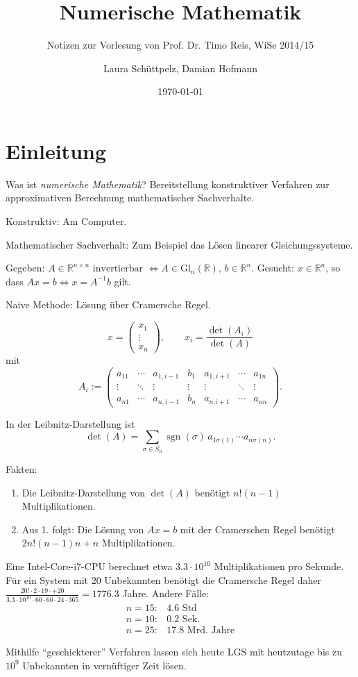\documentclass[11pt]{scrartcl}
\title{Numerische Mathematik}
\subtitle{Notizen zur Vorlesung von Prof. Dr. Timo Reis, WiSe 2014/15}
\author{Laura Schüttpelz, Damian Hofmann}
\date{\today}
\newcommand*{\RR}{\mathbb R}
\newcommand*{\Gl}{\mathrm{Gl}}
\newcommand{\e}[1]{\cdot 10^{#1}}
\DeclareMathOperator*{\sgn}{\mathrm{sgn}}
\theoremstyle{break}
\theoremstyle{remark}
\begin{document}
\maketitle

\section{Einleitung}
Was ist \emph{numerische Mathematik}? Bereitstellung konstruktiver Verfahren zur approximativen Berechnung mathematischer Sachverhalte.

Konstruktiv: Am Computer.

Mathematischer Sachverhalt: Zum Beispiel das Lösen linearer Gleichungssysteme.

\begin{Beispiel}

Gegeben: $A \in \RR^{n\times n} \text{ invertierbar } \Leftrightarrow A \in \Gl_n(\RR)$,
$b \in \RR^n$.
Gesucht: $x \in \RR^n$, so dass $Ax = b \Leftrightarrow x = A^{-1} b$ gilt.

Naive Methode: Lösung über Cramersche Regel.

$$x = \begin{pmatrix}x_1 \\ \vdots \\ x_n \end{pmatrix}, \qquad x_i = \frac{\det(A_i)}{\det(A)}$$
mit $$A_i :=
\begin{pmatrix}
  a_{11} & \cdots & a_{1,i-1} & b_1 & a_{1,i+1} & \cdots & a_{1n} \\
  \vdots & \ddots & \vdots & \vdots & \vdots & \ddots & \vdots \\
  a_{n1} & \cdots & a_{n,i-1} & b_n & a_{n.i+1} & \cdots & a_{nn}
\end{pmatrix}.$$

In der Leibnitz-Darstellung ist $$\det(A) = \sum_{\sigma\in S_n} \sgn(\sigma)\, a_{1\sigma(1)} \cdots a_{n\sigma(n)}.$$

Fakten:
\begin{enumerate}
\item Die Leibnitz-Darstellung von $\det(A)$ benötigt $n! (n-1)$ Multiplikationen.
\item Aus 1. folgt: Die Lösung von $Ax=b$ mit der Cramerschen Regel benötigt $2n!(n-1)n + n$
      Multiplikationen.
\end{enumerate}

Eine Intel-Core-i7-CPU berechnet etwa $3.3\e{10}$ Multiplikationen pro Sekunde.
Für ein System mit 20 Unbekannten benötigt die Cramersche Regel daher
$ \frac{20! \cdot 2 \cdot 19 \cdot +20}{3.3 \cdot 10^{10} 
\cdot 60 \cdot 60 \cdot 24 \cdot 365} = 1776.3$ Jahre.
Andere Fälle:
\begin{align*}
n = 15\colon & 4.6\text{ Std}\\
n = 10\colon & 0.2\text{ Sek.}\\
n = 25\colon & 17.8\text{ Mrd. Jahre}
\end{align*}

Mithilfe "`geschickterer"' Verfahren lassen sich heute LGS mit heutzutage bis zu $10^9$
Unbekannten in vernüftiger Zeit lösen.
\end{Beispiel}
\end{document}
